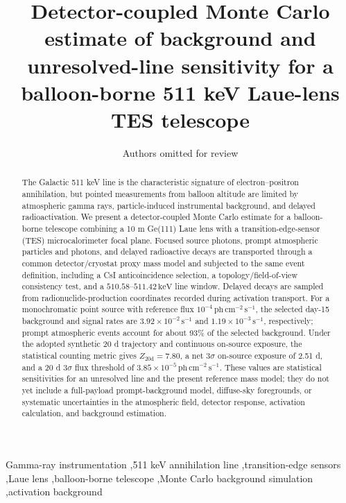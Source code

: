 \documentclass[preprint,12pt]{elsarticle}
\newcommand{\keV}{\,\mathrm{keV}}
\newcommand{\phcms}{\,\mathrm{ph\,cm^{-2}\,s^{-1}}}
\newcommand{\cps}{\,\mathrm{s^{-1}}}
\begin{document}
\begin{frontmatter}

\title{Detector-coupled Monte Carlo estimate of background and unresolved-line sensitivity for a balloon-borne 511 keV Laue-lens TES telescope}

\author[inst1]{Authors omitted for review}
\address[inst1]{Affiliations omitted for review}

\begin{abstract}
The Galactic 511 keV line is the characteristic signature of electron--positron annihilation, but pointed measurements from balloon altitude are limited by atmospheric gamma rays, particle-induced instrumental background, and delayed radioactivation. We present a detector-coupled Monte Carlo estimate for a balloon-borne telescope combining a 10 m Ge(111) Laue lens with a transition-edge-sensor (TES) microcalorimeter focal plane. Focused source photons, prompt atmospheric particles and photons, and delayed radioactive decays are transported through a common detector/cryostat proxy mass model and subjected to the same event definition, including a CsI anticoincidence selection, a topology/field-of-view consistency test, and a $510.58$--$511.42\keV$ line window. Delayed decays are sampled from radionuclide-production coordinates recorded during activation transport. For a monochromatic point source with reference flux $10^{-4}\phcms$, the selected day-15 background and signal rates are $3.92\times10^{-2}\cps$ and $1.19\times10^{-3}\cps$, respectively; prompt atmospheric events account for about 93\% of the selected background. Under the adopted synthetic 20 d trajectory and continuous on-source exposure, the statistical counting metric gives $Z_{20\mathrm{d}}=7.80$, a net $3\sigma$ on-source exposure of 2.51 d, and a 20 d $3\sigma$ flux threshold of $3.85\times10^{-5}\phcms$. These values are statistical sensitivities for an unresolved line and the present reference mass model; they do not yet include a full-payload prompt-background model, diffuse-sky foregrounds, or systematic uncertainties in the atmospheric field, detector response, activation calculation, and background estimation.
\end{abstract}

\begin{keyword}
Gamma-ray instrumentation \sep 511 keV annihilation line \sep transition-edge sensors \sep Laue lens \sep balloon-borne telescope \sep Monte Carlo background simulation \sep activation background
\end{keyword}

\end{frontmatter}
\end{document}
